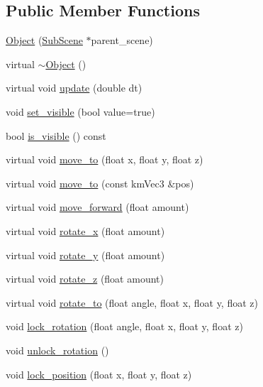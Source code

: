 \subsection*{Public Member Functions}
\begin{DoxyCompactItemize}
\item 
\hyperlink{classkglt_1_1_object_a5099ea2eac659584e40d3e0edaa30055}{Object} (\hyperlink{classkglt_1_1_sub_scene}{Sub\-Scene} $\ast$parent\-\_\-scene)
\item 
virtual \hyperlink{classkglt_1_1_object_aea9122ef4cb28dff9c6b10069fa8a4f9}{$\sim$\-Object} ()
\item 
virtual void \hyperlink{classkglt_1_1_object_a17edce4626d3bfdc1c5dff79cee194e6}{update} (double dt)
\item 
void \hyperlink{classkglt_1_1_object_a58677f483d51aad260963a97feaa660d}{set\-\_\-visible} (bool value=true)
\item 
bool \hyperlink{classkglt_1_1_object_afb12b73708d7264abbbd1fa1d9db3770}{is\-\_\-visible} () const 
\item 
virtual void \hyperlink{classkglt_1_1_object_ae5d42e9e86a2146a0a99af3ad02c7049}{move\-\_\-to} (float x, float y, float z)
\item 
virtual void \hyperlink{classkglt_1_1_object_a499098c63d6c3112561cf107556b3253}{move\-\_\-to} (const km\-Vec3 \&pos)
\item 
virtual void \hyperlink{classkglt_1_1_object_a9aa9d891b28c1330b71131dc02fb9cd9}{move\-\_\-forward} (float amount)
\item 
virtual void \hyperlink{classkglt_1_1_object_afafdc9db0d8fd696c3a5581b380af38c}{rotate\-\_\-x} (float amount)
\item 
virtual void \hyperlink{classkglt_1_1_object_a0ffaae4f0801c6e4ba2d4d7b4c2e520a}{rotate\-\_\-y} (float amount)
\item 
virtual void \hyperlink{classkglt_1_1_object_aecb34c3cdbcf56a734afbf7b35a3e0cb}{rotate\-\_\-z} (float amount)
\item 
virtual void \hyperlink{classkglt_1_1_object_a41956e68892bcc675584b33b4dd3d2d4}{rotate\-\_\-to} (float angle, float x, float y, float z)
\item 
void \hyperlink{classkglt_1_1_object_af208f7305bfd5814912357c930cd5e9f}{lock\-\_\-rotation} (float angle, float x, float y, float z)
\item 
void \hyperlink{classkglt_1_1_object_aeb8605963351d5da4c5703f9c2372109}{unlock\-\_\-rotation} ()
\item 
void \hyperlink{classkglt_1_1_object_ad6abad6dbfe659a3b2007d333c18512a}{lock\-\_\-position} (float x, float y, float z)

\end{DoxyCompactItemize}
